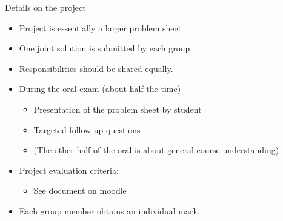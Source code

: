 \begin{frame}{Details on the project}
    \begin{itemize}
        \vspace{-0.3em}
        \item Project is essentially a larger problem sheet
        \vspace{-0.3em}
        \item One joint solution is submitted by each group
        \vspace{-0.3em}
        \item Responsibilities should be shared equally.
        \vspace{1.0em}
        \item During the oral exam \textcolor{grey5}{(about half the time)}
            \begin{itemize}
                \vspace{-0.3em}
                \item Presentation of the problem sheet by student
                \vspace{-0.3em}
                \item Targeted follow-up questions
                \vspace{-0.3em}
                \item \textcolor{grey5}{(The other half of the oral
                    is about general course understanding)}
            \end{itemize}
        \vspace{1.0em}
        \item Project evaluation criteria:
            \begin{itemize}
                \vspace{-0.3em}
                \item See document on moodle
            \end{itemize}
        \vspace{1.0em}
        \item Each group member obtains an \alert{individual mark}.
    \end{itemize}
\end{frame}

